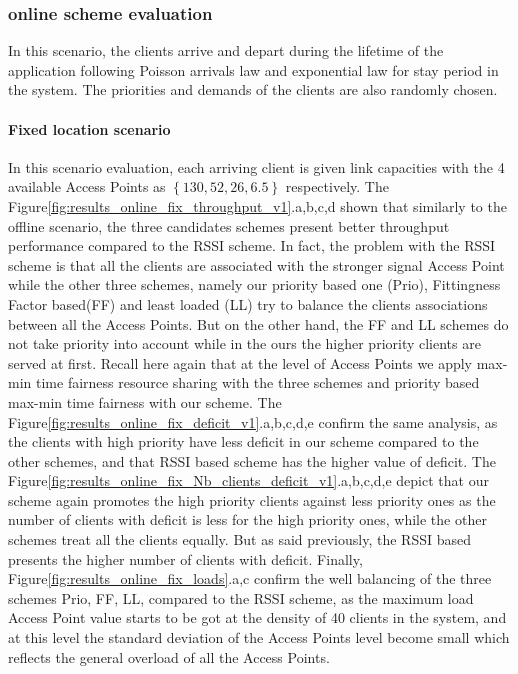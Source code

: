 \documentclass[journal,transmag]{IEEEtran}
\begin{document}
\subsubsection{online scheme evaluation}
In this scenario, the clients arrive and depart during the lifetime of the application following Poisson arrivals law and exponential law for stay period in the system. The priorities and demands of the clients are also randomly chosen.

\paragraph{Fixed location scenario}
In this scenario evaluation, each arriving client is given link capacities with the 4 available Access Points as $\left\{130,52,26,6.5 \right\}$ respectively. The Figure\ref{fig:results_online_fix_throughput_v1}.a,b,c,d shown that similarly to the offline scenario, the three candidates schemes present better throughput performance compared to the RSSI scheme. In fact, the problem with the RSSI scheme is that all the clients are associated with the stronger signal Access Point while the other three schemes, namely our priority based one (Prio), Fittingness Factor based(FF) and least loaded (LL) try to balance the clients associations between all the Access Points. But on the other hand, the FF and LL schemes do not take priority into account while in the ours the higher priority clients are served at first. Recall here again that at the level of Access Points we apply max-min time fairness resource sharing with the three schemes and priority based max-min time fairness with our scheme. The Figure\ref{fig:results_online_fix_deficit_v1}.a,b,c,d,e confirm the same analysis, as the clients with high priority have less deficit in our scheme compared to the other schemes, and that RSSI based scheme has the higher value of deficit. The Figure\ref{fig:results_online_fix_Nb_clients_deficit_v1}.a,b,c,d,e depict that our scheme again promotes the high priority clients against less priority ones as the number of clients with deficit is less for the high priority ones, while the other schemes treat all the clients equally. But as said previously, the RSSI based presents the higher number of clients with deficit. Finally, Figure\ref{fig:results_online_fix_loads}.a,c confirm the well balancing of the three schemes Prio, FF, LL, compared to the RSSI scheme, as the maximum load Access Point value starts to be got at the density of 40 clients in the system, and at this level the standard deviation of the Access Points level become small which reflects the general overload of all the Access Points.  
 
\end{document}
